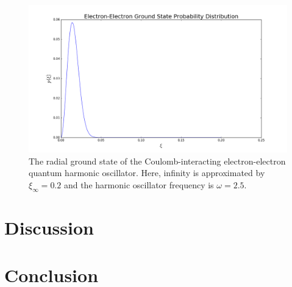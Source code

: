 \documentclass[reprint,english]{revtex4-1}
\begin{document}
\begin{figure}[h!]
\centering
\includegraphics[scale=0.275]{InteractingElectrons/plots/prob200_50.png}
\caption{The radial ground state of the Coulomb-interacting electron-electron quantum harmonic oscillator. Here, infinity is approximated by \(\xi_\infty=0.2\) and the harmonic oscillator frequency is \(\omega=2.5\).}
\label{fig:interactingelectrons_eigenvectors3}
\end{figure}
\section{Discussion}


\section{Conclusion}

\nocite{lecture_ode}\nocite{lecture_linalg}


\end{document}
